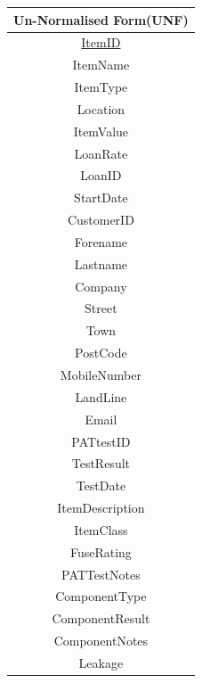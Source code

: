 \begin{center}
    \begin{tabular}{|c|}
        \hline
        \textbf{Un-Normalised Form(UNF)}\\ \hline
        \underline{ItemID}              \\
        ItemName                        \\
        ItemType                        \\
        Location                        \\ 
        ItemValue                       \\ 
        LoanRate                        \\ 
        LoanID                          \\ 
        StartDate                       \\ 
        CustomerID                      \\ 
        Forename                        \\ 
        Lastname                        \\ 
        Company                         \\ 
        Street                          \\ 
        Town                            \\ 
        PostCode                        \\ 
        MobileNumber                    \\ 
        LandLine                        \\ 
        Email                           \\ 
        PATtestID                       \\
        TestResult                      \\ 
        TestDate                        \\ 
        ItemDescription                 \\ 
        ItemClass                       \\ 
        FuseRating                      \\ 
        PATTestNotes                    \\ 
        ComponentType                   \\
        ComponentResult                 \\
        ComponentNotes                  \\
        Leakage                         \\ \hline
    \end{tabular}
\end{center}

